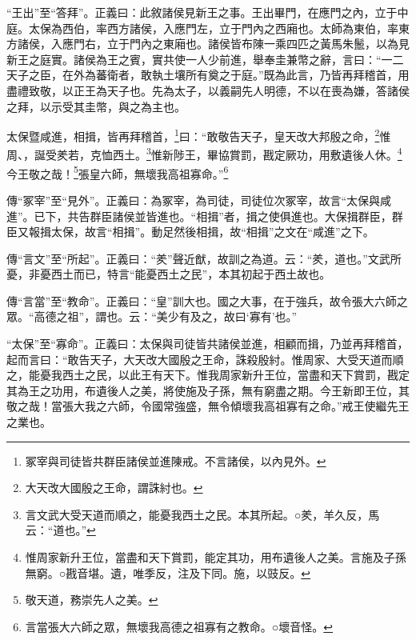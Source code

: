 {\noindent\shu{}\fzkt “王出”至“答拜”。正義曰：此敘諸侯見新王之事。王出畢門，在應門之內，立于中庭。太保為西伯，率西方諸侯，入應門左，立于門內之西廂也。太師為東伯，率東方諸侯，入應門右，立于門內之東廂也。諸侯皆布陳一乘四匹之黃馬朱鬛，以為見新王之庭實。諸侯為王之賓，實共使一人少前進，舉奉圭兼幣之辭，言曰：“一二天子之臣，在外為蕃衛者，敢執土壤所有奠之于庭。”既為此言，乃皆再拜稽首，用盡禮致敬，以正王為天子也。先為太子，以義嗣先人明德，不以在喪為嫌，答諸侯之拜，以示受其圭幣，與之為主也。 \par}

太保暨咸進，相揖，皆再拜稽首，\footnote{冢宰與司徒皆共群臣諸侯並進陳戒。不言諸侯，以內見外。}曰：“敢敬告天子，皇天改大邦殷之命，\footnote{大天改大國殷之王命，謂誅紂也。}惟周、，誕受羑若，克恤西土。\footnote{言文武大受天道而順之，能憂我西土之民。本其所起。○羑，羊久反，馬云：“道也。”}惟新陟王，畢協賞罰，戡定厥功，用敷遺後人休。\footnote{惟周家新升王位，當盡和天下賞罰，能定其功，用布遺後人之美。言施及子孫無窮。○戡音堪。遺，唯季反，注及下同。施，以豉反。}今王敬之哉！\footnote{敬天道，務崇先人之美。}張皇六師，無壞我高祖寡命。”\footnote{言當張大六師之眾，無壞我高德之祖寡有之教命。○壞音怪。}


{\noindent\zhuan{}\fzbyks 傳“冢宰”至“見外”。正義曰：為冢宰，為司徒，司徒位次冢宰，故言“太保與咸進”。已下，共告群臣諸侯並皆進也。“相揖”者，揖之使俱進也。大保揖群臣，群臣又報揖太保，故言“相揖”。動足然後相揖，故“相揖”之文在“咸進”之下。 \par}

{\noindent\zhuan{}\fzbyks 傳“言文”至“所起”。正義曰：“羑”聲近猷，故訓之為道。云：“羑，道也。”文武所憂，非憂西土而已，特言“能憂西土之民”，本其初起于西土故也。 \par}

{\noindent\zhuan{}\fzbyks 傳“言當”至“教命”。正義曰：“皇”訓大也。國之大事，在于強兵，故令張大六師之眾。“高德之祖”，謂也。云：“美少有及之，故曰‘寡有’也。” \par}

{\noindent\shu{}\fzkt “太保”至“寡命”。正義曰：太保與司徒皆共諸侯並進，相顧而揖，乃並再拜稽首，起而言曰：“敢告天子，大天改大國殷之王命，誅殺殷紂。惟周家、大受天道而順之，能憂我西土之民，以此王有天下。惟我周家新升王位，當盡和天下賞罰，戡定其為王之功用，布遺後人之美，將使施及子孫，無有窮盡之期。今王新即王位，其敬之哉！當張大我之六師，令國常強盛，無令傾壞我高祖寡有之命。”戒王使繼先王之業也。 \par}

